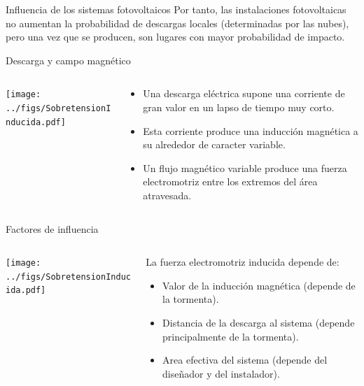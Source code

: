 \documentclass[aspectratio=169, usenames,svgnames,dvipsnames]{beamer}
\begin{document}
\begin{frame}[label={sec:org4a263af}]{Influencia de los sistemas fotovoltaicos}
Por tanto, \alert{las instalaciones fotovoltaicas no aumentan la probabilidad
de descargas locales} (determinadas por las nubes), pero una vez que se
producen, son lugares con mayor probabilidad de impacto.
\end{frame}

\begin{frame}[label={sec:org120d51b},plain]{Descarga y campo magnético}
\begin{columns}
\begin{column}{0.4\columnwidth}
\begin{center}
\texttt{[image: ../figs/SobretensionInducida.pdf]}
\end{center}
\end{column}
\begin{column}{0.6\columnwidth}
\begin{itemize}
\item Una descarga eléctrica supone una \alert{corriente de gran valor} en un lapso de \alert{tiempo muy corto}.

\item Esta corriente produce una \alert{inducción magnética} a su alrededor de caracter \alert{variable}.

\item Un flujo magnético variable produce una \alert{fuerza electromotriz} entre los extremos del área atravesada.
\end{itemize}
\end{column}
\end{columns}
\end{frame}

\begin{frame}[label={sec:orgac4a9dc},plain]{Factores de influencia}
\begin{columns}
\begin{column}{0.4\columnwidth}
\begin{center}
\texttt{[image: ../figs/SobretensionInducida.pdf]}
\end{center}
\end{column}
\begin{column}{0.6\columnwidth}
La fuerza electromotriz inducida depende de:

\begin{itemize}
\item \alert{Valor de la inducción magnética} (depende de la tormenta).

\item \alert{Distancia} de la descarga al sistema (depende principalmente de la
tormenta).

\item \alert{Area efectiva del sistema} (depende del diseñador y del instalador).
\end{itemize}
\end{column}
\end{columns}
\end{frame}
\end{document}
